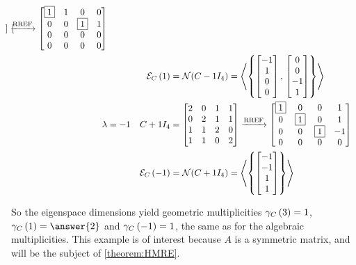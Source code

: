 \documentclass{ximera}
\begin{document}
\begin{example}
\begin{align*}
\begin{bmatrix}
                       \end{bmatrix}
                                     \xrightarrow{\text{RREF}}
                                     \begin{bmatrix}
                                       \fbox{1} & 1 & 0 & 0\\
                                       0 & 0 & \fbox{1} & 1\\
                                       0 & 0 & 0 & 0\\
                                       0 & 0 & 0 & 0
                                     \end{bmatrix}\\
           &&\mathcal{E}_{C}\left(1\right)&=\mathcal{N}\!\left(C-1I_4\right)
                                =\left\langle\left\{\begin{bmatrix}-1\\1\\0\\0\end{bmatrix},\,\begin{bmatrix}0\\0\\-1\\1\end{bmatrix}\right\}\right\rangle\\
    \lambda&=-1&C+1I_4&=
                        \begin{bmatrix}
                          2 & 0 & 1 & 1\\
                          0 & 2 & 1 & 1\\
                          1 & 1 & 2 & 0\\
                          1 & 1 & 0 & 2
                        \end{bmatrix}
                                      \xrightarrow{\text{RREF}}
                                      \begin{bmatrix}
                                        \fbox{1} & 0 & 0 & 1\\
                                        0 & \fbox{1} & 0 & 1\\
                                        0 & 0 & \fbox{1} & -1\\
                                        0 & 0 & 0 & 0
                                      \end{bmatrix}\\
           &&\mathcal{E}_{C}\left(-1\right)&=\mathcal{N}\!\left(C+1I_4\right)
                                 =\left\langle\left\{\begin{bmatrix}-1\\-1\\1\\1\end{bmatrix}\right\}\right\rangle\\
  \end{align*}

  So the eigenspace dimensions yield geometric multiplicities
  $\gamma_{C}\left(3\right)=1$, $\geomult{C}{1}=\answer{2}$ and
  $\gamma_{C}\left(-1\right)=1$, the same as for the algebraic multiplicities.
  This example is of interest because $A$ is a symmetric matrix, and
  will be the subject of \ref{theorem:HMRE}.

\end{example}
\end{document}
